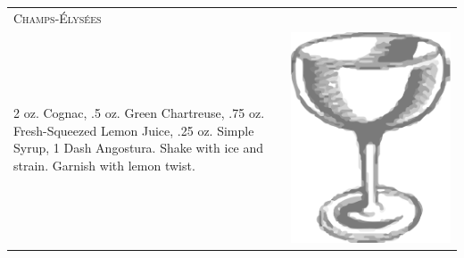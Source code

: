 \documentclass{article}
\begin{document}
\begin{multicols}{2}
\begin{tabular}{p{2in} p{0.5in}}
\multicolumn{2}{p{3in}}{\centering\Huge\textsc{Champs-\'{E}lys\'{e}es}} \\ 
  \vspace{-0.1in}2 oz. Cognac, .5 oz. Green Chartreuse, .75 oz. Fresh-Squeezed Lemon Juice, .25 oz. Simple Syrup, 1 Dash Angostura. Shake with ice and strain.  Garnish with lemon twist.&
  \vspace{-0.1in} \includegraphics{egg_coupe.png}
\end{tabular}


\end{multicols}
\end{document}

